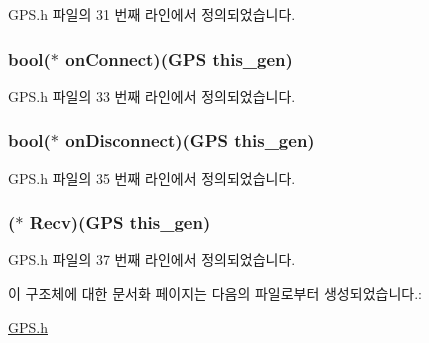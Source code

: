 G\-P\-S.\-h 파일의 31 번째 라인에서 정의되었습니다.

\hypertarget{struct__gps_ac1e7688363e326df6919afc5d8cc848c}{
\subsubsection[{on\-Connect}]{\setlength{\rightskip}{0pt plus 5cm}bool($\ast$  on\-Connect)({\bf G\-P\-S} this\-\_\-gen)}}\label{struct__gps_ac1e7688363e326df6919afc5d8cc848c}


G\-P\-S.\-h 파일의 33 번째 라인에서 정의되었습니다.

\hypertarget{struct__gps_a7ad2cd5581984147767aa12d71a7ff74}{
\subsubsection[{on\-Disconnect}]{\setlength{\rightskip}{0pt plus 5cm}bool($\ast$  on\-Disconnect)({\bf G\-P\-S} this\-\_\-gen)}}\label{struct__gps_a7ad2cd5581984147767aa12d71a7ff74}


G\-P\-S.\-h 파일의 35 번째 라인에서 정의되었습니다.

\hypertarget{struct__gps_a983b023f987a119a6df5c57b8a998f61}{
\subsubsection[{Recv}]{($\ast$  Recv)({\bf G\-P\-S} this\-\_\-gen)}}\label{struct__gps_a983b023f987a119a6df5c57b8a998f61}


G\-P\-S.\-h 파일의 37 번째 라인에서 정의되었습니다.



이 구조체에 대한 문서화 페이지는 다음의 파일로부터 생성되었습니다.\-:\begin{DoxyCompactItemize}
\item 
\hyperlink{_g_p_s_8h}{G\-P\-S.\-h}\end{DoxyCompactItemize}
